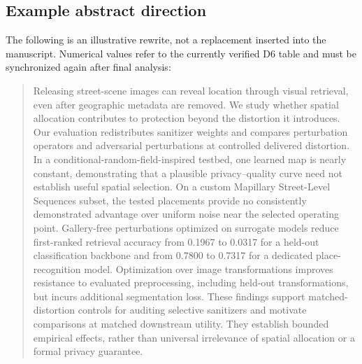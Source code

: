 \documentclass[11pt,a4paper]{article}
\begin{document}
\subsection{Example abstract direction}
The following is an illustrative rewrite, not a replacement inserted into the manuscript. Numerical values refer to the currently verified D6 table and must be synchronized again after final analysis:
\begin{quote}
Releasing street-scene images can reveal location through visual retrieval, even after geographic metadata are removed. We study whether spatial allocation contributes to protection beyond the distortion it introduces. Our evaluation redistributes sanitizer weights and compares perturbation operators and adversarial perturbations at controlled delivered distortion. In a conditional-random-field-inspired testbed, one learned map is nearly constant, demonstrating that a plausible privacy--quality curve need not establish useful spatial selection. On a custom Mapillary Street-Level Sequences subset, the tested placements provide no consistently demonstrated advantage over uniform noise near the selected operating point. Gallery-free perturbations optimized on surrogate models reduce first-ranked retrieval accuracy from 0.1967 to 0.0317 for a held-out classification backbone and from 0.7800 to 0.7317 for a dedicated place-recognition model. Optimization over image transformations improves resistance to evaluated preprocessing, including held-out transformations, but incurs additional segmentation loss. These findings support matched-distortion controls for auditing selective sanitizers and motivate comparisons at matched downstream utility. They establish bounded empirical effects, rather than universal irrelevance of spatial allocation or a formal privacy guarantee.
\end{quote}
\end{document}

